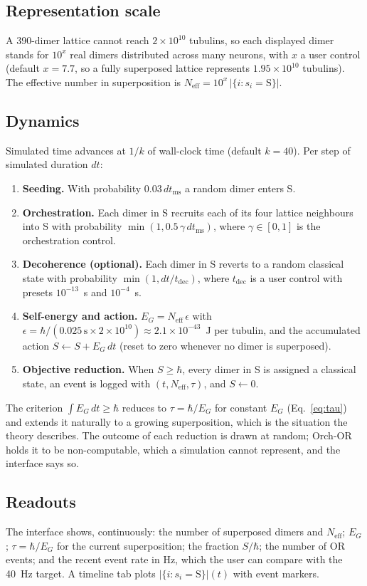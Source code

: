 \documentclass[11pt]{article}
\begin{document}
\subsection{Representation scale}
A 390-dimer lattice cannot reach $2\times10^{10}$ tubulins, so each displayed dimer stands for $10^{x}$ real dimers distributed across many neurons, with $x$ a user control (default $x=7.7$, so a fully superposed lattice represents $1.95\times10^{10}$ tubulins). The effective number in superposition is $N_\mathrm{eff} = 10^{x}\,|\{i : s_i = \mathrm{S}\}|$.

\subsection{Dynamics}
Simulated time advances at $1/k$ of wall-clock time (default $k=40$). Per step of simulated duration $dt$:
\begin{enumerate}
\item \textbf{Seeding.} With probability $0.03\,dt_\mathrm{ms}$ a random dimer enters S.
\item \textbf{Orchestration.} Each dimer in S recruits each of its four lattice neighbours into S with probability $\min(1, 0.5\,\gamma\, dt_\mathrm{ms})$, where $\gamma\in[0,1]$ is the orchestration control.
\item \textbf{Decoherence (optional).} Each dimer in S reverts to a random classical state with probability $\min(1, dt/t_\mathrm{dec})$, where $t_\mathrm{dec}$ is a user control with presets $10^{-13}$~s and $10^{-4}$~s.
\item \textbf{Self-energy and action.} $E_G = N_\mathrm{eff}\,\epsilon$ with $\epsilon = \hbar/(0.025\,\mathrm{s}\times 2\times10^{10}) \approx 2.1\times10^{-43}$~J per tubulin, and the accumulated action $S \leftarrow S + E_G\,dt$ (reset to zero whenever no dimer is superposed).
\item \textbf{Objective reduction.} When $S \ge \hbar$, every dimer in S is assigned a classical state, an event is logged with $(t, N_\mathrm{eff}, \tau)$, and $S\leftarrow 0$.
\end{enumerate}
The criterion $\int E_G\,dt \ge \hbar$ reduces to $\tau = \hbar/E_G$ for constant $E_G$ (Eq.~\ref{eq:tau}) and extends it naturally to a growing superposition, which is the situation the theory describes. The outcome of each reduction is drawn at random; Orch-OR holds it to be non-computable, which a simulation cannot represent, and the interface says so.

\subsection{Readouts}
The interface shows, continuously: the number of superposed dimers and $N_\mathrm{eff}$; $E_G$; $\tau = \hbar/E_G$ for the current superposition; the fraction $S/\hbar$; the number of OR events; and the recent event rate in Hz, which the user can compare with the 40~Hz target. A timeline tab plots $|\{i: s_i=\mathrm{S}\}|(t)$ with event markers.
\end{document}
